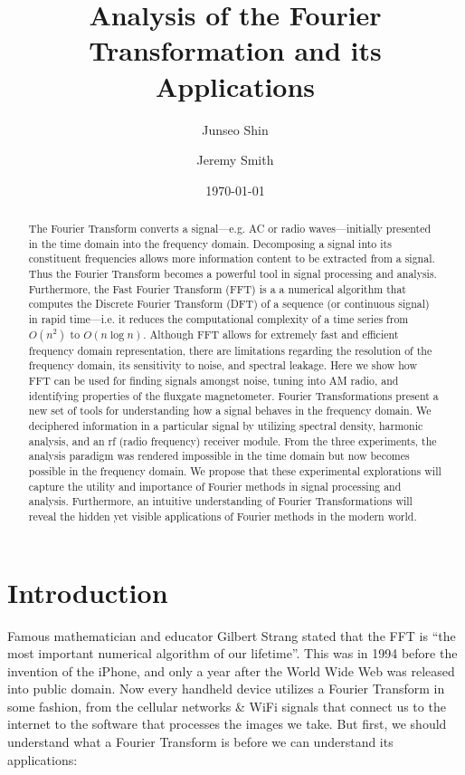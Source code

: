\documentclass[prl,twocolumn,superscriptaddress,floatfix]{revtex4}
\begin{document}
\title{Analysis of the Fourier Transformation and its Applications}
\author{Junseo Shin}
\author{Jeremy Smith}

\date{\today}

\begin{abstract}
The Fourier Transform converts a signal---e.g. AC or radio waves---initially presented in the time domain into the frequency domain.
Decomposing a signal into its constituent frequencies allows more information content to be extracted from a signal. 
Thus the Fourier Transform becomes a powerful tool in signal processing and analysis.
Furthermore, the Fast Fourier Transform (FFT) is a 
a numerical algorithm that computes the Discrete Fourier Transform (DFT) of a sequence (or continuous signal) in rapid time---i.e. it reduces the computational complexity of a time series from $O(n^2)$ to $O(n \log n)$\cite{FFT}.
Although FFT allows for extremely fast and efficient frequency domain representation, there are limitations regarding the resolution of the frequency domain,
its sensitivity to noise, and spectral leakage. 
Here we show how FFT can be used for finding signals amongst noise, tuning into AM radio, and identifying properties of the fluxgate magnetometer. 
Fourier Transformations present a new set of tools for understanding how a signal behaves in the frequency domain.
We deciphered information in a particular signal by utilizing spectral density, harmonic analysis, and an rf (radio frequency) receiver module. 
From the three experiments, the analysis paradigm was rendered impossible in the time domain but now becomes possible in the frequency domain.
We propose that these experimental explorations will capture the utility and importance of Fourier methods in signal processing and analysis.
Furthermore, an intuitive understanding of Fourier Transformations will reveal the hidden yet visible applications of Fourier methods in the modern world. 
\end{abstract}
\maketitle

\section{Introduction}
Famous mathematician and educator Gilbert Strang stated that the FFT is ``the most important numerical algorithm of our lifetime''\cite{strang}.
This was in 1994 before the invention of the iPhone, and only a year after the World Wide Web was released into public domain\cite{cernweb}.
Now every handheld device utilizes a Fourier Transform in some fashion, from the cellular networks \& WiFi signals that connect us to the internet to the software that processes the images we take. But first, we should understand what a Fourier Transform is before we can understand its applications:
\end{document}
